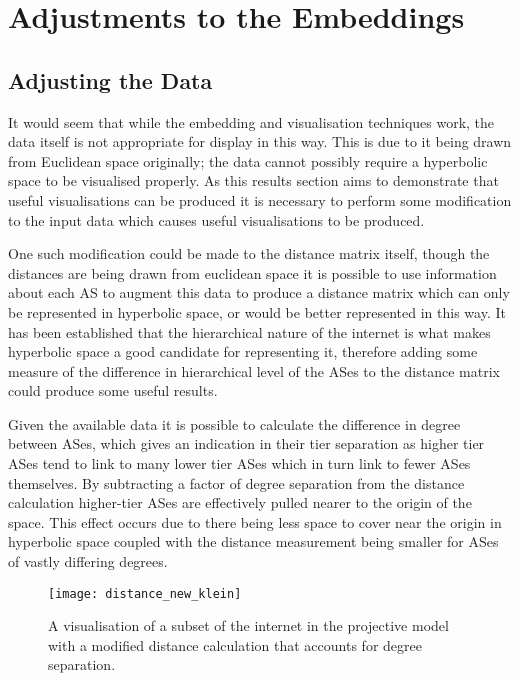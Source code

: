 \chapter{Adjustments to the Embeddings}

\section{Adjusting the Data}
\label{sec:adjusting}

It would seem that while the embedding and visualisation techniques work, the data itself is not appropriate for display in this way. This is due to it being drawn from Euclidean space originally; the data cannot possibly require a hyperbolic space to be visualised properly. As this results section aims to demonstrate that useful visualisations can be produced it is necessary to perform some modification to the input data which causes useful visualisations to be produced. 

One such modification could be made to the distance matrix itself, though the distances are being drawn from euclidean space it is possible to use information about each AS to augment this data to produce a distance matrix which can only be represented in hyperbolic space, or would be better represented in this way. It has been established that the hierarchical nature of the internet is what makes hyperbolic space a good candidate for representing it, therefore adding some measure of the difference in hierarchical level of the ASes to the distance matrix could produce some useful results. 

Given the available data it is possible to calculate the difference in degree between ASes, which gives an indication in their tier separation as higher tier ASes tend to link to many lower tier ASes which in turn link to fewer ASes themselves. By subtracting a factor of degree separation from the distance calculation higher-tier ASes are effectively pulled nearer to the origin of the space. This effect occurs due to there being less space to cover near the origin in hyperbolic space coupled with the distance measurement being smaller for ASes of vastly differing degrees. 

\begin{figure}
	\label{fig:distance_new_klein}
	\centering
	\texttt{[image: distance\_new\_klein]}
	\caption{A visualisation of a subset of the internet in the projective model with a modified distance calculation that accounts for degree separation.}
\end{figure}

